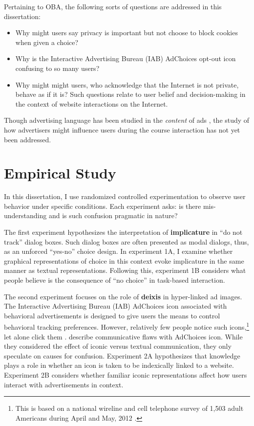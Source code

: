 Pertaining to OBA, the following sorts of questions are addressed in this dissertation:

\begin{itemize}
\item Why might users say privacy is important but not choose to block cookies when given a choice?

\item Why is the Interactive Advertising Bureau (IAB) AdChoices opt-out icon confusing to so many users?

\item Why might might users, who acknowledge that the Internet is not private, behave as if it is?
Such questions relate to user belief and decision-making in the context of website interactions on the Internet.

\end{itemize}

Though advertising language has been studied in the \emph{content} of ads  \citep{Leech:1966wr,Geis:1982uf,Harris:1983tj,Vestergaard:1985vn,Cook:2001up,Tanaka:1999tq},  the study of how advertisers might influence users during the course interaction has not yet been addressed. 

\section{Empirical Study}
\label{empiricalstudy}

In this dissertation, I use randomized controlled experimentation to observe user behavior under specific conditions. Each experiment asks: is there mis-understanding and is such confusion pragmatic in nature?

The first experiment hypothesizes the interpretation of \textbf{implicature} in ``do not track'' dialog boxes. Such dialog boxes are often presented as modal dialogs, thus, as an unforced ``yes-no'' choice design. In experiment 1A, I examine whether graphical representations of choice in this context evoke implicature in the same manner as textual representations. Following this, experiment 1B considers what people believe is the consequence of ``no choice'' in task-based interaction.

The second experiment focuses on the role of \textbf{deixis} in hyper-linked ad images. The Interactive Advertising Bureau (IAB) AdChoices icon associated with behavioral advertisements is designed to give users the means to control behavioral tracking preferences. However, relatively few people notice such  icons,\footnote{This is based on a national wireline and cell telephone survey of 1,503 adult Americans during April and May, 2012 \citep{TheNonTransparency:2012ut}.}  let alone click them  \citep*{TheNonTransparency:2012ut,Logic:2011wn}.   \cite*{Leon:2012dk,Ur:2012ws}  describe communicative flaws with AdChoices icon. While they considered the effect of iconic versus textual communication, they only speculate on causes for confusion. Experiment 2A hypothesizes that knowledge plays a role in whether an icon is taken to be indexically linked to a website. Experiment 2B considers whether familiar iconic representations affect how users interact with advertisements in context.

